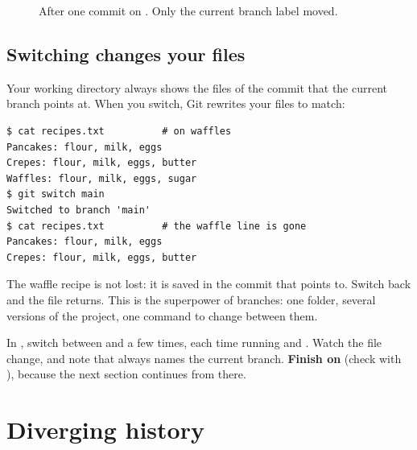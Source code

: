 \begin{figure}[H]
\centering
{}
\caption{After one commit on . Only the current branch label moved.}
\label{fig:commit}
\end{figure}

\subsection*{Switching changes your files}

Your working directory always shows the files of the commit that the current branch points at. When you switch, Git rewrites your files to match:

\begin{lstlisting}
$ cat recipes.txt          # on waffles
Pancakes: flour, milk, eggs
Crepes: flour, milk, eggs, butter
Waffles: flour, milk, eggs, sugar
$ git switch main
Switched to branch 'main'
$ cat recipes.txt          # the waffle line is gone
Pancakes: flour, milk, eggs
Crepes: flour, milk, eggs, butter
\end{lstlisting}

The waffle recipe is not lost: it is saved in the commit that  points to. Switch back and the file returns. This is the superpower of branches: one folder, several versions of the project, one command to change between them.

\begin{tryit}
In , switch between  and  a few times, each time running  and . Watch the file change, and note that  always names the current branch. \textbf{Finish on } (check with ), because the next section continues from there.
\end{tryit}

\section{Diverging history}

